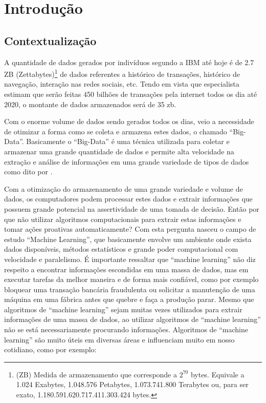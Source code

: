 \chapter{Introdução}
\label{cap:introducao}

\section{Contextualização}
\label{sec:contextualizacao}
	A quantidade de dados gerados por indivíduos segundo a IBM até hoje é de 2.7 ZB (Zettabytes)\footnote{(ZB) Medida de armazenamento que corresponde a $2^{70}$ bytes. Equivale a 1.024 Exabytes,
1.048.576 Petabytes, 1.073.741.800 Terabytes ou, para ser exato, 1.180.591.620.717.411.303.424 bytes.} de dados referentes a histórico de transações, histórico de navegação, interação nas redes sociais, etc. Tendo em vista que especialista estimam que serão feitas 450 bilhões de transações pela internet todos os dia até 2020, o montante de dados armazenados será de 35 zb.

	Com o enorme volume de dados sendo gerados todos os dias, veio a necessidade de otimizar a forma como se coleta e armazena estes dados, o chamado “Big-Data”. Basicamente o “Big-Data” é uma técnica utilizada para coletar e armazenar uma grande quantidade de dados e permite alta velocidade na extração e análise de informações em uma grande variedade de tipos de dados como dito por \cite{bigdata}. 

	Com a otimização do armazenamento de uma grande variedade e volume de dados, os computadores podem processar estes dados e extrair informações que possuem grande potencial na assertividade de uma tomada de decisão. Então por que não utilizar algoritmos computacionais para extrair estas informações e tomar ações proativas automaticamente? Com esta pergunta nasceu o campo de estudo “Machine Learning”, que basicamente envolve um ambiente onde exista dados disponíveis, métodos estatísticos e grande poder computacional com velocidade e paralelismo. 
	É importante ressaltar que “machine learning” não diz respeito a encontrar informações escondidas em uma massa de dados, mas em executar tarefas da melhor maneira e de forma mais confiável, como por exemplo bloquear uma transação bancária fraudulenta ou solicitar a manutenção de uma máquina em uma fábrica antes que quebre e faça a produção parar. Mesmo que algoritmos de “machine learning” sejam muitas vezes utilizados para extrair informações de uma massa de dados, ao utilizar algoritmos de “machine learning” não se está necessariamente procurando informações. Algoritmos de “machine learning” são muito úteis em diversas áreas e influenciam muito em nosso cotidiano, como por exemplo:

